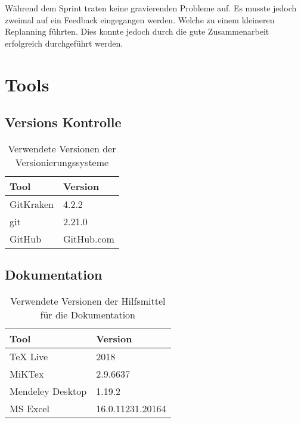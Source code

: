 Während dem Sprint traten keine gravierenden Probleme auf.
Es musste jedoch zweimal auf ein Feedback eingegangen werden. Welche zu einem kleineren Replanning führten. Dies konnte jedoch durch die gute Zusammenarbeit erfolgreich durchgeführt werden.
\newpage

\section{Tools}
\label{sec:Tools}

\subsection{Versions Kontrolle}
\begin{table}[h!]
	\begin{tabular}{p{} p{}}
		\hline
		\textbf{Tool} & \textbf{Version} \\
		\hline
		GitKraken & 4.2.2 \\
		\hline
		git & 2.21.0 \\
		\hline
		GitHub & GitHub.com \\
		\hline
	\end{tabular}
	\caption{Verwendete Versionen der Versionierungssysteme}
\end{table}

\subsection{Dokumentation}
\begin{table}[h!]
	\begin{tabular}{p{} p{}}
		\hline
		\textbf{Tool} & \textbf{Version} \\
		\hline
		TeX Live & 2018 \\
		\hline
		MiKTex & 2.9.6637 \\
		\hline
		Mendeley Desktop & 1.19.2 \\
		\hline
		MS Excel & 16.0.11231.20164 \\
		\hline
	\end{tabular}
	\caption{Verwendete Versionen der Hilfsmittel für die Dokumentation}
\end{table}


